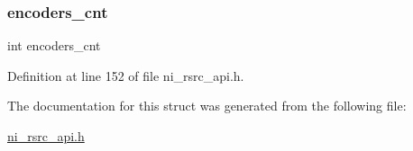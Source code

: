 \subsubsection{\texorpdfstring{encoders\_cnt}{encoders\_cnt}}
{\footnotesize\ttfamily int encoders\+\_\+cnt}



Definition at line 152 of file ni\+\_\+rsrc\+\_\+api.\+h.



The documentation for this struct was generated from the following file\+:\begin{DoxyCompactItemize}
\item 
\mbox{\hyperlink{ni__rsrc__api_8h}{ni\+\_\+rsrc\+\_\+api.\+h}}\end{DoxyCompactItemize}
